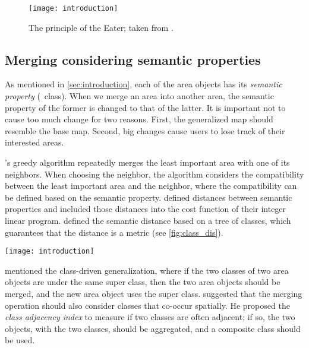 \documentclass[twocolumn]{svjour3}          %
\begin{document}
\begin{figure}[tb]
\centering
\texttt{[image: introduction]}
\caption{The principle of the Eater;
taken from \citet{Suba2014Merge}.}
\label{fig:eater}
\end{figure}



\subsection{Merging considering semantic properties}

As mentioned in \sect\ref{sec:introduction}, 
each of the area objects has its \emph{semantic property} (\ie~class).
When we merge an area into another area, 
the semantic property of the former is changed to that of the latter.
It is important not to cause too much change for two reasons.
First, the generalized map should resemble the base map.
Second, big changes cause users to lose track of their interested areas.

's greedy algorithm repeatedly merges 
the least important area with one of its neighbors.
When choosing the neighbor, the algorithm considers 
the compatibility between the least important area and the neighbor,
where the compatibility can be defined based on the semantic property.
\citet{HaunertWolff2010AreaAgg} defined distances between semantic properties 
and included those distances 
into the cost function of their integer linear program.
\citet{Peng2020AreaAgg} defined the semantic distance 
based on a tree of classes,
which guarantees that the distance is a metric 
(see \fig\ref{fig:class_dis}).   


\begin{figure*}[tb]
\centering
\texttt{[image: introduction]}
\caption{A way of defining distances between the classes;
taken from \citet{Peng2020AreaAgg}.}
\label{fig:class_dis}
\end{figure*}

 mentioned the class-driven generalization, 
where if the two classes of two area objects are under the same super class,
then the two area objects should be merged, 
and the new area object uses the super class.
 suggested that
the merging operation should also consider classes that co-occur spatially.
He proposed the \emph{class adjacency index} to measure 
if two classes are often adjacent;
if so, the two objects, with the two classes, should be aggregated,
and a composite class should be used.
\end{document}
